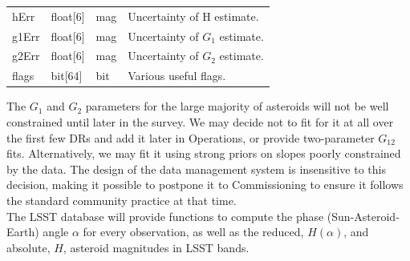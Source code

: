 \documentclass[12pt]{article}
\newcommand{\req}[1]{\marginpar{\tiny #1}}
\newcommand{\dmreq}[1]{\req{DMS-REQ-#1}}
\begin{document}
\begin{center}
\begin{longtable}{p{3cm}p{2cm}p{2cm}p{5cm}}
hErr & float[6] & mag & Uncertainty of H estimate.\\

g1Err & float[6] & mag & Uncertainty of $G_1$ estimate. \\

g2Err & float[6] & mag & Uncertainty of $G_2$ estimate. \\

flags & bit[64] & bit & Various useful flags. \\ \hline

\end{longtable}
\end{center}

The $G_1$ and $G_2$ parameters for the large majority of asteroids will not be well constrained until later in the survey. We may decide not to fit for it at all over the first few DRs and add it later in Operations, or provide two-parameter $G_{12}$ fits. Alternatively, we may fit it using strong priors on slopes poorly constrained by the data. The design of the data management system is insensitive to this decision, making it possible to postpone it to Commissioning to ensure it follows the standard community practice at that time.
\\

The LSST database will provide functions to compute the phase (Sun-Asteroid-Earth) angle $\alpha$ for every observation, as well as the reduced, $H(\alpha)$, and absolute, $H$, asteroid magnitudes in LSST bands.\dmreq{0323}
\end{document}
